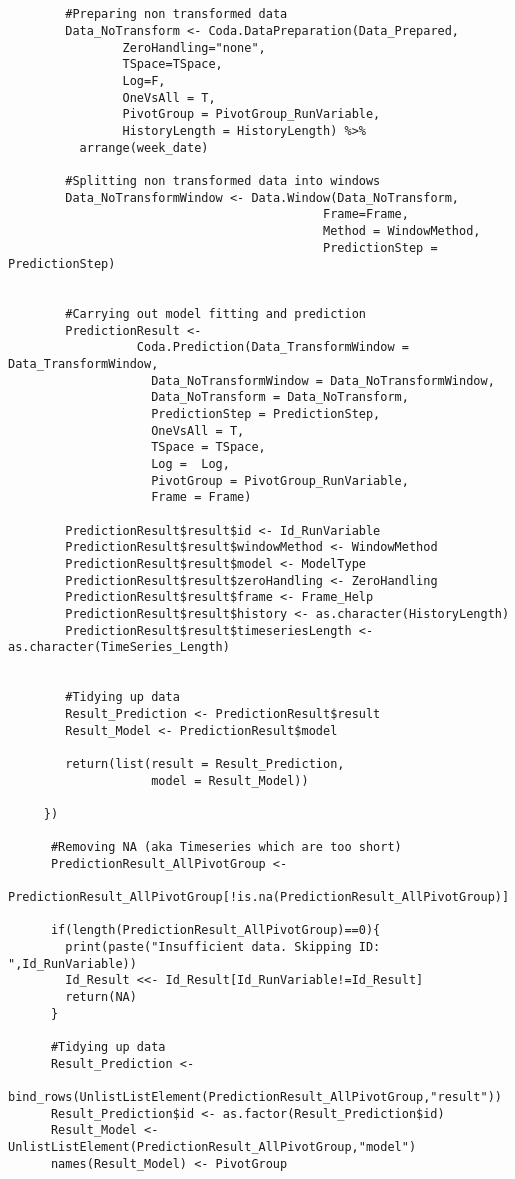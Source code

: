 \begin{verbatim}
        
        
        #Preparing non transformed data 
        Data_NoTransform <- Coda.DataPreparation(Data_Prepared,
				ZeroHandling="none",
				TSpace=TSpace, 
				Log=F, 
				OneVsAll = T,
				PivotGroup = PivotGroup_RunVariable,
				HistoryLength = HistoryLength) %>%
          arrange(week_date)
					
        #Splitting non transformed data into windows
        Data_NoTransformWindow <- Data.Window(Data_NoTransform,
                                            Frame=Frame,
                                            Method = WindowMethod,
                                            PredictionStep = PredictionStep)
        
        
        #Carrying out model fitting and prediction
        PredictionResult <- 
				  Coda.Prediction(Data_TransformWindow = Data_TransformWindow,
					Data_NoTransformWindow = Data_NoTransformWindow,
					Data_NoTransform = Data_NoTransform, 
					PredictionStep = PredictionStep,
					OneVsAll = T,
					TSpace = TSpace,
					Log =  Log,
					PivotGroup = PivotGroup_RunVariable,
					Frame = Frame)
					
        PredictionResult$result$id <- Id_RunVariable
        PredictionResult$result$windowMethod <- WindowMethod
        PredictionResult$result$model <- ModelType 
        PredictionResult$result$zeroHandling <- ZeroHandling
        PredictionResult$result$frame <- Frame_Help
        PredictionResult$result$history <- as.character(HistoryLength)
        PredictionResult$result$timeseriesLength <- as.character(TimeSeries_Length)
      
          
        #Tidying up data
        Result_Prediction <- PredictionResult$result
        Result_Model <- PredictionResult$model
        
        return(list(result = Result_Prediction,
                    model = Result_Model))
        
     })
      
      #Removing NA (aka Timeseries which are too short)
      PredictionResult_AllPivotGroup <- 
			  PredictionResult_AllPivotGroup[!is.na(PredictionResult_AllPivotGroup)]
      
      if(length(PredictionResult_AllPivotGroup)==0){
        print(paste("Insufficient data. Skipping ID: ",Id_RunVariable))
        Id_Result <<- Id_Result[Id_RunVariable!=Id_Result]
        return(NA)
      }
    
      #Tidying up data
      Result_Prediction <- 
			  bind_rows(UnlistListElement(PredictionResult_AllPivotGroup,"result"))
      Result_Prediction$id <- as.factor(Result_Prediction$id)
      Result_Model <- UnlistListElement(PredictionResult_AllPivotGroup,"model")
      names(Result_Model) <- PivotGroup
    

\end{verbatim}
